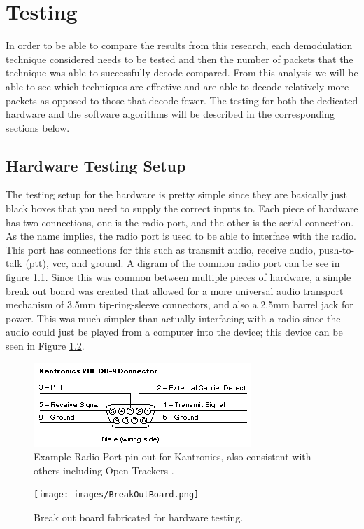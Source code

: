 \chapter{Testing}
In order to be able to compare the results from this research, each demodulation technique considered needs to be tested and then the number of packets that the technique was able to successfully decode compared. From this analysis we will be able to see which techniques are effective and are able to decode relatively more packets as opposed to those that decode fewer. The testing for both the dedicated hardware and the software algorithms will be described in the corresponding sections below.

\section{Hardware Testing Setup}
The testing setup for the hardware is pretty simple since they are basically just black boxes that you need to supply the correct inputs to. Each piece of hardware has two connections, one is the radio port, and the other is the serial connection. As the name implies, the radio port is used to be able to interface with the radio. This port has connections for this such as transmit audio, receive audio, push-to-talk (ptt), vcc, and ground. A digram of the common radio port can be see in figure \ref{RadioPortPinout}. Since this was common between multiple pieces of hardware, a simple break out board was created that allowed for a more universal audio transport mechanism of 3.5mm tip-ring-sleeve connectors, and also a 2.5mm barrel jack for power. This was much simpler than actually interfacing with a radio since the audio could just be played from a computer into the device; this device can be seen in Figure \ref{BreakOutBoard}. 

\begin{figure}
  \centering
	\includegraphics[width=0.75\linewidth]{images/RadioPortPinout.png} 
	\caption{Example Radio Port pin out for Kantronics, also consistent with others including Open Trackers \cite{Martin2014}.}
   \label{RadioPortPinout}
\end{figure}
\begin{figure}
  \centering
	\texttt{[image: images/BreakOutBoard.png]} 
	\caption{Break out board fabricated for hardware testing.}
   \label{BreakOutBoard}
\end{figure}

